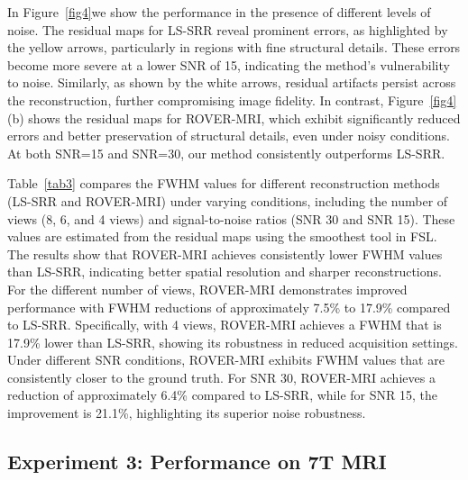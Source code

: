 \documentclass[AMA,STIX2COL]{MRM}
\begin{document}
In Figure~\ref{fig4}we show the performance in the presence of different levels of noise. The residual maps for LS-SRR reveal prominent errors, as highlighted by the yellow arrows, particularly in regions with fine structural details. These errors become more severe at a lower SNR of 15, indicating the method's vulnerability to noise. Similarly, as shown by the white arrows, residual artifacts persist across the reconstruction, further compromising image fidelity. In contrast, Figure~\ref{fig4}(b) shows the residual maps for ROVER-MRI, which exhibit significantly reduced errors and better preservation of structural details, even under noisy conditions. At both SNR=15 and SNR=30, our method consistently outperforms LS-SRR. 

Table~\ref{tab3} compares the FWHM values for different reconstruction methods (LS-SRR and ROVER-MRI) under varying conditions, including the number of views (8, 6, and 4 views) and signal-to-noise ratios (SNR 30 and SNR 15). These values are estimated from the residual maps using the smoothest tool in FSL\cite{manzano2024denoising, jenkinson2012fsl,flitney2000cluster}. The results show that ROVER-MRI achieves consistently lower FWHM values than LS-SRR, indicating better spatial resolution and sharper reconstructions.
%
For the different number of views, ROVER-MRI demonstrates improved performance with FWHM reductions of approximately 7.5\% to 17.9\% compared to LS-SRR. Specifically, with 4 views, ROVER-MRI achieves a FWHM that is 17.9\% lower than LS-SRR, showing its robustness in reduced acquisition settings.
%
Under different SNR conditions, ROVER-MRI exhibits FWHM values that are consistently closer to the ground truth. For SNR 30, ROVER-MRI achieves a reduction of approximately 6.4\% compared to LS-SRR, while for SNR 15, the improvement is 21.1\%, highlighting its superior noise robustness.
%

\subsection{Experiment 3: Performance on 7T MRI}
\end{document}
